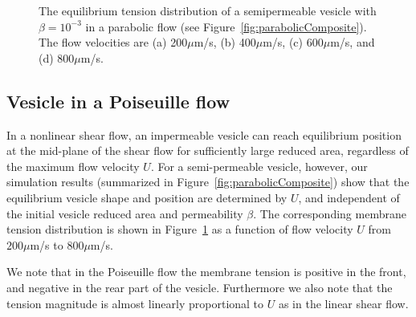 \documentclass[9pt,twocolumn,twoside,lineno]{pnas-new}
\begin{document}
\begin{figure}[htp]
  \centering
  \caption{\label{fig:parabolicTensions} The equilibrium tension
  distribution of a semipermeable vesicle with $\beta=10^{-3}$ in a parabolic
  flow (see Figure~\ref{fig:parabolicComposite}). The flow velocities
  are (a) 200$\mu$m/s, (b) 400$\mu$m/s, (c) 600$\mu$m/s, and (d)
  800$\mu$m/s.}
\end{figure}

\subsection*{Vesicle in a Poiseuille flow}
In a nonlinear shear flow, an impermeable vesicle can reach equilibrium
position at the mid-plane of the shear flow for sufficiently large
reduced area, regardless of the maximum flow velocity $U$. For a
semi-permeable vesicle, however, our simulation results (summarized in
Figure~\ref{fig:parabolicComposite}) show that the equilibrium vesicle
shape and position are determined by $U$, and independent of the initial
vesicle reduced area and permeability $\beta$. The corresponding
membrane tension distribution is shown in
Figure~\ref{fig:parabolicTensions} as a function of flow velocity $U$
from $200\mu$m/s to $800\mu$m/s.

We note that in the Poiseuille flow the membrane tension is positive in
the front, and negative in the rear part of the vesicle. Furthermore we
also note that the tension magnitude is almost linearly proportional to
$U$ as in the linear shear flow.
\end{document}
